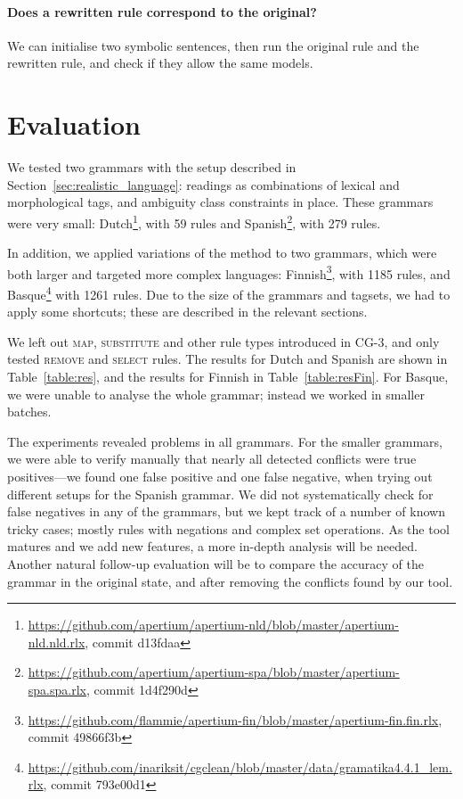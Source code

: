 {{\paragraph{Does a rewritten rule correspond to the original?}
We can initialise two symbolic sentences, then run the original rule and the rewritten rule, and check if they allow the same models.

\section{Evaluation}
\label{sec:eval}

We tested two grammars with the setup described in
Section~\ref{sec:realistic_language}: readings as combinations of
lexical and morphological tags, and ambiguity class constraints in place.
These grammars were very small:
Dutch\footnote{\scriptsize{\url{https://github.com/apertium/apertium-nld/blob/master/apertium-nld.nld.rlx}, commit d13fdaa}},
with 59 rules and
Spanish\footnote{\scriptsize{\url{https://github.com/apertium/apertium-spa/blob/master/apertium-spa.spa.rlx}, commit 1d4f290d}},
with 279 rules.

In addition, we applied variations of the method to two grammars,
which were both larger and targeted more complex languages:
Finnish\footnote{\scriptsize{\url{https://github.com/flammie/apertium-fin/blob/master/apertium-fin.fin.rlx}, commit 49866f3b}},
with 1185 rules, and
Basque\footnote{\scriptsize{\url{https://github.com/inariksit/cgclean/blob/master/data/gramatika4.4.1_lem.rlx}, commit 793e00d1}}
with 1261 rules. Due to the size of the grammars and tagsets, we had
to apply some shortcuts; these are described in the relevant sections.

We left out \textsc{map}, \textsc{substitute} and other rule
types introduced in CG-3, and only tested \textsc{remove} and \textsc{select} rules.
The results for Dutch and Spanish are shown in Table~\ref{table:res},
and the results for Finnish in Table~\ref{table:resFin}. For Basque,
we were unable to analyse the whole grammar; instead we worked in
smaller batches.


The experiments revealed problems in all grammars. For the smaller
grammars, we were able to verify manually that nearly all detected conflicts were
true positives---we found one false positive and one false negative,
when trying out different setups for the Spanish grammar.
We did not systematically check for false negatives in any of the
grammars, but we kept track of a number of known tricky cases; mostly
rules with negations and complex set operations.
As the tool matures and we add new features, a more in-depth analysis
will be needed.
Another natural follow-up evaluation will be to compare the accuracy of the
grammar in the original state, and after removing the conflicts found
by our tool.


}}
